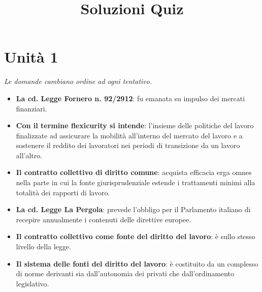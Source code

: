 \documentclass[12pt, a4paper]{report}
\begin{document}
\begin{titlepage}
    \title{Soluzioni Quiz}
    \author{}
    \date{}
\end{titlepage}
\maketitle
\tableofcontents
\chapter{Unità 1}
\textit{Le domande cambiano ordine ad ogni tentativo.}
\begin{itemize}
    \item \textbf{La cd. Legge Fornero n. 92/2912}: fu emanata su impulso dei mercati finanziari.
    \item \textbf{Con il termine flexicurity si intende}: l’insieme delle politiche del lavoro finalizzate ad assicurare la mobilità all’interno del mercato del lavoro e a sostenere il reddito dei lavoratori nei periodi di transizione da un lavoro all’altro.
    \item \textbf{Il contratto collettivo di diritto comune}: acquista efficacia erga omnes nella parte in cui la fonte giurisprudenziale estende i trattamenti minimi alla totalità dei rapporti di lavoro.
    \item \textbf{La cd. Legge La Pergola}: prevede l’obbligo per il Parlamento italiano di recepire annualmente i contenuti delle direttive europee.
    \item \textbf{Il contratto collettivo come fonte del diritto del lavoro}: è sullo stesso livello della legge.
    \item \textbf{Il sistema delle fonti del diritto del lavoro}: è costituito da un complesso di norme derivanti sia dall’autonomia dei privati che dall’ordinamento legislativo.
\end{itemize}
\end{document}
